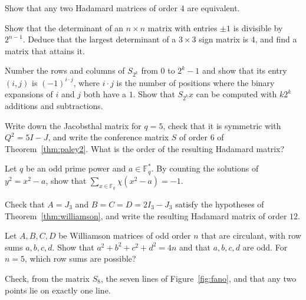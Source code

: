 \begin{exercise}[$\star$]\label{ex:order4}
Show that any two Hadamard matrices of order $4$ are equivalent.
\end{exercise}

\begin{exercise}[$\star\star$]\label{ex:det3}
Show that the determinant of an $n\times n$ matrix with entries $\pm1$ is divisible by $2^{n-1}$. Deduce that the largest determinant of a $3\times3$
sign matrix is $4$, and find a matrix that attains it.
\end{exercise}

\begin{exercise}[$\star$]\label{ex:walsh}
Number the rows and columns of $S_{2^k}$ from $0$ to $2^k-1$ and show that its entry $(i,j)$ is $(-1)^{i\cdot j}$, where $i\cdot j$ is the number of
positions where the binary expansions of $i$ and $j$ both have a $1$. Show that $S_{2^k}x$ can be computed with $k2^k$ additions and subtractions.
\end{exercise}

\begin{exercise}[$\star$]\label{ex:paley5}
Write down the Jacobsthal matrix for $q=5$, check that it is symmetric with $Q^2=5I-J$, and write the conference matrix $S$ of order $6$ of
Theorem~\ref{thm:paley2}. What is the order of the resulting Hadamard matrix?
\end{exercise}

\begin{exercise}[$\star\star$]\label{ex:charsum}
Let $q$ be an odd prime power and $a\in\mathbb F_q^*$. By counting the solutions of $y^2=x^2-a$, show that $\sum_{x\in\mathbb F_q}\chi(x^2-a)=-1$.
\end{exercise}

\begin{exercise}[$\star$]\label{ex:williamson3}
Check that $A=J_3$ and $B=C=D=2I_3-J_3$ satisfy the hypotheses of Theorem~\ref{thm:williamson}, and write the resulting Hadamard matrix of order $12$.
\end{exercise}

\begin{exercise}[$\star\star$]\label{ex:williamsonsums}
Let $A,B,C,D$ be Williamson matrices of odd order $n$ that are circulant, with row sums $a,b,c,d$. Show that $a^2+b^2+c^2+d^2=4n$ and that $a,b,c,d$ are
odd. For $n=5$, which row sums are possible?
\end{exercise}

\begin{exercise}[$\star$]\label{ex:fano}
Check, from the matrix $S_8$, the seven lines of Figure~\ref{fig:fano}, and that any two points lie on exactly one line.
\end{exercise}


